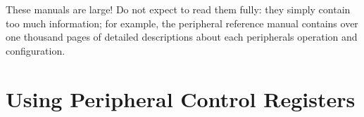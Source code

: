 \documentclass[11pt,fleqn]{book} %
\begin{document}
\begin{warning}
    These manuals are large! Do not expect to read them fully: they simply contain too much information; for example, the peripheral reference manual contains over one thousand pages of detailed descriptions about each peripherals operation and configuration.
\end{warning}


\section{Using Peripheral Control Registers}



%
%
%
%
%    
%
%
\end{document}
